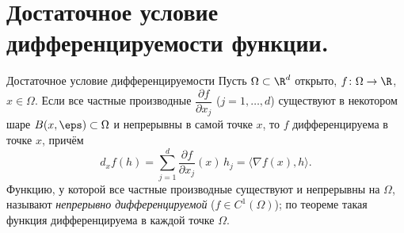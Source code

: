 
\section{Достаточное условие дифференцируемости функции.}

\begin{Theorem}{Достаточное условие дифференцируемости}{}
	Пусть $\Omega\subset\R^d$ открыто, $f\colon\Omega\to\R$, $x\in\Omega$. Если все частные производные $\dfrac{\partial f}{\partial x_j}$ ($j=1,\dots,d$) существуют в некотором шаре $B(x,\eps)\subset\Omega$ и непрерывны в самой точке $x$, то $f$ дифференцируема в точке $x$, причём
	\[
	d_xf(h)=\sum_{j=1}^{d}\frac{\partial f}{\partial x_j}(x)\,h_j=\langle\nabla f(x),h\rangle.
	\]
	Функцию, у которой все частные производные существуют и непрерывны на $\Omega$, называют \emph{непрерывно дифференцируемой} ($f\in C^1(\Omega)$); по теореме такая функция дифференцируема в каждой точке $\Omega$.
\end{Theorem}

